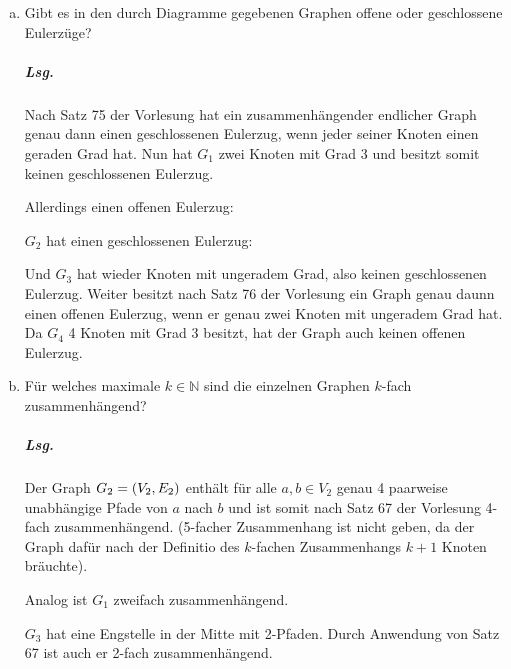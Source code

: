\documentclass{scrreprt}
\begin{document}
\begin{enumerate}[(a)]
\item Gibt es in den durch Diagramme gegebenen Graphen offene oder geschlossene
  Eulerzüge?

  \subparagraph{Lsg.} Nach Satz 75 der Vorlesung hat ein zusammenhängender
  endlicher Graph genau dann einen geschlossenen Eulerzug, wenn jeder seiner
  Knoten einen geraden Grad hat.
  Nun hat $G_1$ zwei Knoten mit Grad 3 und besitzt somit keinen geschlossenen
  Eulerzug.

  Allerdings einen offenen Eulerzug:



  $G_2$ hat einen geschlossenen Eulerzug:


  Und $G_3$ hat wieder Knoten mit ungeradem Grad, also keinen geschlossenen Eulerzug.
  Weiter besitzt nach Satz 76 der Vorlesung ein Graph genau daunn einen offenen
  Eulerzug, wenn er genau zwei Knoten mit ungeradem Grad hat.
  Da $G_4$ 4 Knoten mit Grad 3 besitzt, hat der Graph auch keinen offenen Eulerzug.

\newpage
\item Für welches maximale $k \in \mathbb{N}$ sind die einzelnen Graphen $k$-fach
  zusammenhängend?

  \subparagraph{Lsg.} Der Graph $G_2 = \qty(V_2, E_2)$ enthält für alle
  $a, b \in V_2$ genau 4 paarweise unabhängige Pfade von $a$ nach $b$ und ist
  somit nach Satz 67 der Vorlesung 4-fach zusammenhängend.
  (5-facher Zusammenhang ist nicht geben, da der Graph dafür nach der Definitio
  des $k$-fachen Zusammenhangs $k + 1$ Knoten bräuchte).

  Analog ist $G_1$ zweifach zusammenhängend.

  $G_3$ hat eine Engstelle in der Mitte mit 2-Pfaden.
  Durch Anwendung von Satz 67 ist auch er 2-fach zusammenhängend.
\end{enumerate}
\end{document}
